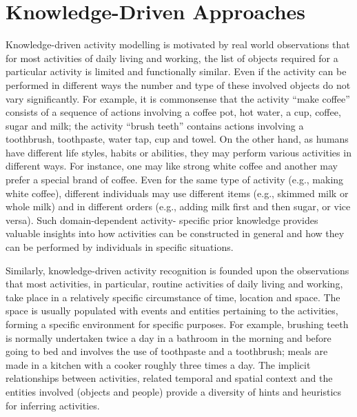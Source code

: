 \section{Knowledge-Driven Approaches}
\label{sec:soa:knowledgedriven}

Knowledge-driven activity modelling is motivated by real world observations that for most activities of daily living and working, the list of objects required for a particular activity is limited and functionally similar. Even if the activity can be performed in different ways the number and type of these involved objects do not vary significantly. For example, it is commonsense that the activity “make coffee” consists of a sequence of actions involving a coffee pot, hot water, a cup, coffee, sugar and milk; the activity “brush teeth” contains actions involving a toothbrush, toothpaste, water tap, cup and towel. On the other hand, as humans have different life styles, habits or abilities, they may perform various activities in different ways. For instance, one may like strong white coffee and another may prefer a special brand of coffee. Even for the same type of activity (e.g., making white coffee), different individuals may use different items (e.g., skimmed milk or whole milk) and in different orders (e.g., adding milk first and then sugar, or vice versa). Such domain-dependent activity- specific prior knowledge provides valuable insights into how activities can be constructed in general and how they can be performed by individuals in specific situations.

Similarly, knowledge-driven activity recognition is founded upon the observations that most activities, in particular, routine activities of daily living and working, take place in a relatively specific circumstance of time, location and space. The space is usually populated with events and entities pertaining to the activities, forming a specific environment for specific purposes. For example, brushing teeth is normally undertaken twice a day in a bathroom in the morning and before going to bed and involves the use of toothpaste and a toothbrush; meals are made in a kitchen with a cooker roughly three times a day. The implicit relationships between activities, related temporal and spatial context and the entities involved (objects and people) provide a diversity of hints and heuristics for inferring activities.

